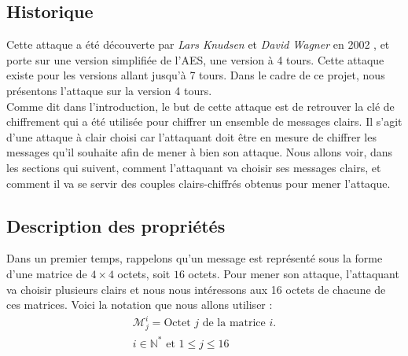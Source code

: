 \subsection{Historique}

\indent Cette attaque a été découverte par \textit{Lars Knudsen} et \textit{David Wagner} en 2002 \cite{integralcryptanalysis}, et porte sur une version simplifiée de l'AES, une version à 4 tours. Cette attaque existe pour les versions allant jusqu'à 7 tours. Dans le cadre de ce projet, nous présentons l'attaque sur la version 4 tours. \\
\indent Comme dit dans l'introduction, le but de cette attaque est de retrouver la clé de chiffrement qui a été utilisée pour chiffrer un ensemble de messages clairs. Il s'agit d'une attaque à clair choisi car l'attaquant doit être en mesure de chiffrer les messages qu'il souhaite afin de mener à bien son attaque. 
Nous allons voir, dans les sections qui suivent, comment l'attaquant va choisir ses messages clairs, et comment il va se servir des couples clairs-chiffrés obtenus pour mener l'attaque.

\subsection{Description des propriétés}

\indent Dans un premier temps, rappelons qu'un message est représenté sous la forme d'une matrice de $4 \times 4$ octets, soit $16$ octets. Pour mener son attaque, l'attaquant va choisir plusieurs clairs et nous nous intéressons aux 16 octets de chacune de ces matrices. Voici la notation que nous allons utiliser : \\
$$
\begin{array}{c}
    \mathcal{M}_{j}^{i} = \text{Octet } j \text{ de la matrice } i. \\
    i \in \mathbb{N}^{*} \text{ et } 1 \leq j \leq 16
\end{array}
$$

